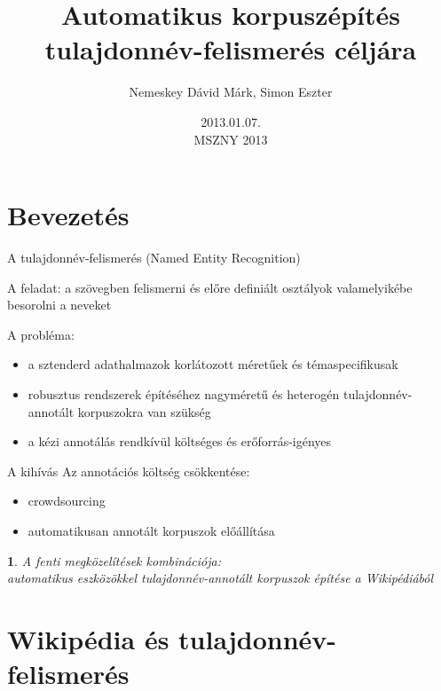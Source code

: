 \documentclass[utf8x,t]{beamer}
\title %
{Automatikus korpuszépítés tulajdonnév-felismerés céljára}
\author %
{Nemeskey Dávid Márk\inst{1}, Simon Eszter\inst{2}}
\institute{\inst{1} MTA SZTAKI \\
\inst{2} MTA Nyelvtudományi Intézet} %
\date %
{2013.01.07. \\ MSZNY 2013}
\newtheorem{nix}{}[section]
\begin{document}
\begin{frame}{}
  \titlepage
\end{frame}

\section{Bevezetés}

\begin{frame}{A tulajdonnév-felismerés (Named Entity Recognition)}

\bigskip

A feladat: a szövegben felismerni és előre definiált osztályok valamelyikébe besorolni a neveket 

\bigskip

A probléma:
\begin{itemize}
\item a sztenderd adathalmazok korlátozott méretűek és témaspecifikusak 
\item robusztus rendszerek építéséhez nagyméretű és heterogén tulajdonnév-annotált korpuszokra van szükség
\item a kézi annotálás rendkívül költséges és erőforrás-igényes
\end{itemize}

\end{frame}

\begin{frame}{A kihívás}
\bigskip
Az annotációs költség csökkentése:

\begin{itemize}
\item crowdsourcing
\item automatikusan annotált korpuszok előállítása
\end{itemize}

\smallskip

\begin{nix}
A fenti megközelítések kombinációja: \\ automatikus eszközökkel tulajdonnév-annotált korpuszok építése a Wikipédiából
\end{nix}

\end{frame}

\section{Wikipédia és tulajdonnév-felismerés}
\end{document}

